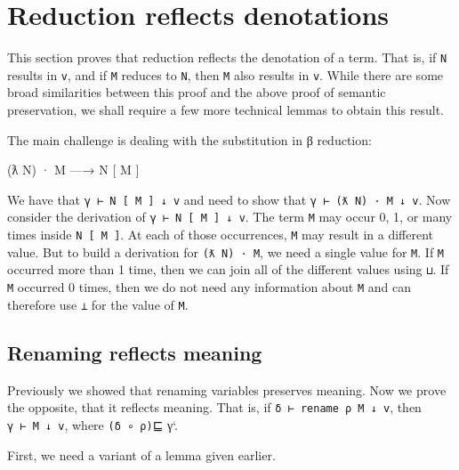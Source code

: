 \hypertarget{reduction-reflects-denotations}{%
\section{Reduction reflects
denotations}\label{reduction-reflects-denotations}}

This section proves that reduction reflects the denotation of a term.
That is, if \texttt{N} results in \texttt{v}, and if \texttt{M} reduces
to \texttt{N}, then \texttt{M} also results in \texttt{v}. While there
are some broad similarities between this proof and the above proof of
semantic preservation, we shall require a few more technical lemmas to
obtain this result.

The main challenge is dealing with the substitution in β reduction:

\begin{myDisplay}
(ƛ N) · M —→ N [ M ]
\end{myDisplay}

We have that \texttt{γ\ ⊢\ N\ {[}\ M\ {]}\ ↓\ v} and need to show that
\texttt{γ\ ⊢\ (ƛ\ N)\ ·\ M\ ↓\ v}. Now consider the derivation of
\texttt{γ\ ⊢\ N\ {[}\ M\ {]}\ ↓\ v}. The term \texttt{M} may occur 0, 1,
or many times inside \texttt{N\ {[}\ M\ {]}}. At each of those
occurrences, \texttt{M} may result in a different value. But to build a
derivation for \texttt{(ƛ\ N)\ ·\ M}, we need a single value for
\texttt{M}. If \texttt{M} occurred more than 1 time, then we can join
all of the different values using \texttt{⊔}. If \texttt{M} occurred 0
times, then we do not need any information about \texttt{M} and can
therefore use \texttt{⊥} for the value of \texttt{M}.

\hypertarget{renaming-reflects-meaning}{%
\subsection{Renaming reflects meaning}\label{renaming-reflects-meaning}}

Previously we showed that renaming variables preserves meaning. Now we
prove the opposite, that it reflects meaning. That is, if
\texttt{δ\ ⊢\ rename\ ρ\ M\ ↓\ v}, then \texttt{γ\ ⊢\ M\ ↓\ v}, where
\texttt{(δ\ ∘\ ρ)}⊑ γ`.

First, we need a variant of a lemma given earlier.

